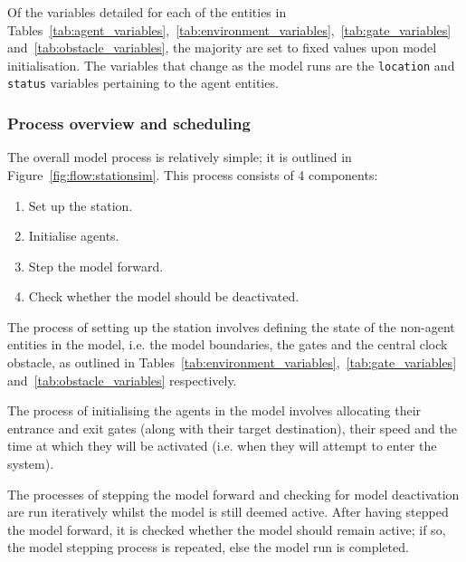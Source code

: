 Of the variables detailed for each of the entities in
Tables~\ref{tab:agent_variables},~\ref{tab:environment_variables},~\ref{tab:gate_variables}
and~\ref{tab:obstacle_variables}, the majority are set
to fixed values upon model initialisation.
The variables that change as the model runs are the \texttt{location} and
\texttt{status} variables pertaining to the agent entities.

\subsubsection{Process overview and
scheduling}\label{subs:stationsim:overview:process}

The overall model process is relatively simple; it is outlined in
Figure~\ref{fig:flow:stationsim}.
This process consists of 4 components:
\begin{enumerate}
    \item Set up the station.
    \item Initialise agents.
    \item Step the model forward.
    \item Check whether the model should be deactivated.
\end{enumerate}
The process of setting up the station involves defining the state of the
non-agent entities in the model, i.e. the model boundaries, the gates and the
central clock obstacle, as outlined in
Tables~\ref{tab:environment_variables},~\ref{tab:gate_variables}
and~\ref{tab:obstacle_variables} respectively.

The process of initialising the agents in the model involves allocating their
entrance and exit gates (along with their target destination), their speed and
the time at which they will be activated (i.e. when they will attempt to enter
the system).

The processes of stepping the model forward and checking for model deactivation
are run iteratively whilst the model is still deemed active.
After having stepped the model forward, it is checked whether the model should
remain active; if so, the model stepping process is repeated, else the model run
is completed.

